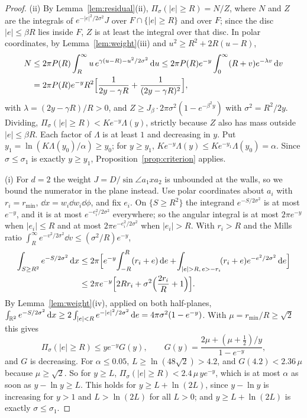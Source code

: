\begin{proof}
(ii) By Lemma~\ref{lem:residual}(ii), $\Pi_\sigma(|e| \ge R) = N/Z$, where $N$ and $Z$ are the integrals of
$e^{-|e|^2/2\sigma^2}J$ over $F \cap \{|e| \ge R\}$ and over $F$; since the disc $|e| \le \beta R$ lies inside $F$, $Z$ is at
least the integral over that disc. In polar coordinates, by Lemma~\ref{lem:weight}(iii) and $u^2 \ge R^2 + 2R(u - R)$,
\begin{align*}
N &\le 2\pi P(R)\int_R^\infty u\,e^{\gamma(u - R) - u^2/2\sigma^2}\,\mathrm{d} u
   \le 2\pi P(R)e^{-y}\int_0^\infty (R + v)e^{-\lambda v}\,\mathrm{d} v\\
  &= 2\pi P(R)e^{-y}R^2\Bigl[\frac{1}{2y - \gamma R} + \frac{1}{(2y - \gamma R)^2}\Bigr],
\end{align*}
with $\lambda = (2y - \gamma R)/R > 0$, and $Z \ge J_\beta\cdot 2\pi\sigma^2(1 - e^{-\beta^2 y})$ with $\sigma^2 = R^2/2y$.
Dividing, $\Pi_\sigma(|e| \ge R) < K e^{-y}\Lambda(y)$, strictly because $Z$ also has mass outside $|e| \le \beta R$.
Each factor of $\Lambda$ is at least $1$ and decreasing in $y$. Put $y_1 = \ln(K\Lambda(y_0)/\alpha) \ge y_0$; for
$y \ge y_1$, $Ke^{-y}\Lambda(y) \le Ke^{-y_1}\Lambda(y_0) = \alpha$. Since $\sigma \le \sigma_1$ is exactly $y \ge y_1$,
Proposition~\ref{prop:criterion} applies.

(i) For $d = 2$ the weight $J = D/\sin\angle a_1xa_2$ is unbounded at the walls, so we bound the numerator in the plane
instead. Use polar coordinates about $a_i$ with $r_i = r_{\min}$, $\dd x = w_i\dd w_i\dd\phi$, and fix $e_i$. On
$\{S \ge R^2\}$ the integrand $e^{-S/2\sigma^2}$ is at most $e^{-y}$, and it is at most $e^{-e_i^2/2\sigma^2}$ everywhere; so the
angular integral is at most $2\pi e^{-y}$ when $|e_i| \le R$ and at most $2\pi e^{-e_i^2/2\sigma^2}$ when $|e_i| > R$. With $r_i > R$ and the Mills ratio
$\int_R^\infty e^{-v^2/2\sigma^2}\dd v \le (\sigma^2/R)e^{-y}$,
\begin{align*}
\int_{S \ge R^2} e^{-S/2\sigma^2}\,\mathrm{d} x
 &\le 2\pi\Bigl[e^{-y}\!\int_{-R}^{R}(r_i + e)\,\mathrm{d} e + \!\int_{|e| > R,\, e > -r_i}\!(r_i + e)e^{-e^2/2\sigma^2}\,\mathrm{d} e\Bigr]\\
 &\le 2\pi e^{-y}\Bigl[2Rr_i + \sigma^2\Bigl(\frac{2r_i}{R} + 1\Bigr)\Bigr].
\end{align*}
By Lemma~\ref{lem:weight}(iv), applied on both half-planes,
$\int_{\mathbb{R}^2} e^{-S/2\sigma^2}\,\mathrm{d} x \ge 2\int_{|e| < R} e^{-|e|^2/2\sigma^2}\,\mathrm{d} e = 4\pi\sigma^2(1 - e^{-y})$. With
$\mu = r_{\min}/R \ge \sqrt2$ this gives
\[ \Pi_\sigma(|e| \ge R) \le y e^{-y} G(y), \qquad G(y) = \frac{2\mu + (\mu + \frac12)/y}{1 - e^{-y}} , \]
and $G$ is decreasing. For $\alpha \le 0.05$, $L \ge \ln(48\sqrt2) > 4.2$, and $G(4.2) < 2.36\,\mu$ because
$\mu \ge \sqrt2$. So for $y \ge L$, $\Pi_\sigma(|e| \ge R) < 2.4\,\mu\,y e^{-y}$, which is at most $\alpha$ as soon as
$y - \ln y \ge L$. This holds for $y \ge L + \ln(2L)$, since $y - \ln y$ is increasing for $y > 1$ and $L > \ln(2L)$ for
all $L > 0$; and $y \ge L + \ln(2L)$ is exactly $\sigma \le \sigma_1$.
\end{proof}

